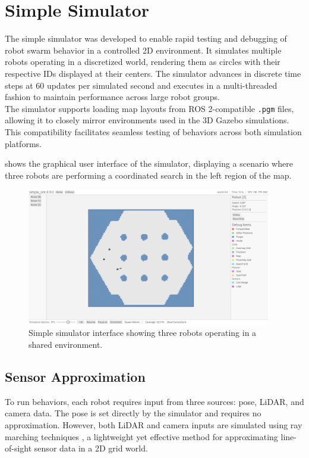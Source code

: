 \section{Simple Simulator}
\label{sec:simple-simulator}
The simple simulator was developed to enable rapid testing and debugging of robot swarm behavior in a controlled 2D environment. It simulates multiple robots operating in a discretized world, rendering them as circles with their respective IDs displayed at their centers. The simulator advances in discrete time steps at 60 updates per simulated second and executes in a multi-threaded fashion to maintain performance across large robot groups.\\

The simulator supports loading map layouts from ROS 2-compatible \texttt{.pgm} files, allowing it to closely mirror environments used in the 3D Gazebo simulations. This compatibility facilitates seamless testing of behaviors across both simulation platforms.

 shows the graphical user interface of the simulator, displaying a scenario where three robots are performing a coordinated search in the left region of the map.

\begin{figure}[H]
    \begin{center}
        \includegraphics[width=0.95\textwidth]{figures/screenshots/simple-sim-gui.png}
    \end{center}
    \caption{Simple simulator interface showing three robots operating in a shared environment.}
    \label{fig:simple-sim-interface}
\end{figure}

\subsection{Sensor Approximation}
To run behaviors, each robot requires input from three sources: pose, LiDAR, and camera data. The pose is set directly by the simulator and requires no approximation. However, both LiDAR and camera inputs are simulated using ray marching techniques \cite{raymarching}, a lightweight yet effective method for approximating line-of-sight sensor data in a 2D grid world.

